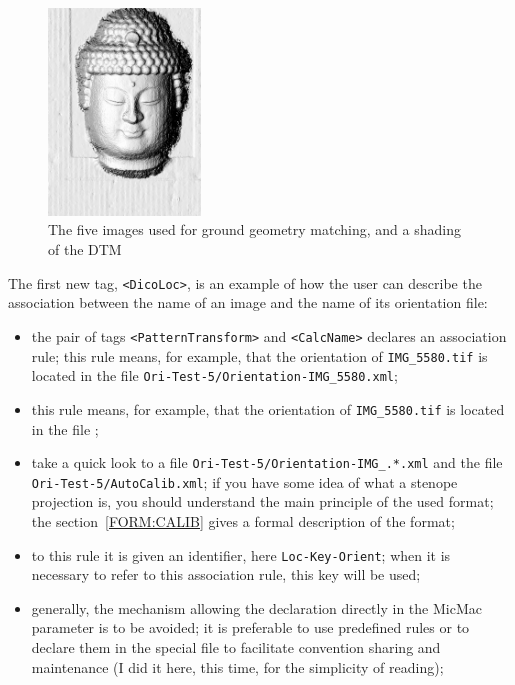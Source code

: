 \begin{figure}
\begin{center}
\includegraphics[height=55mm]{FIGS/Boudhas/Terrain-Shade.jpg}
\caption{The five images used for ground geometry matching, and a shading of the DTM}
\label{FIVEBOUDHA}
\end{center}
\end{figure}

The first new tag, {\tt <DicoLoc>}, is an example of how the user can
describe the association between the name of an image and the name
of its orientation file:

\begin{itemize}
   \item  the pair of tags {\tt  <PatternTransform>} and {\tt <CalcName>} declares an
          association rule; this rule means, for example, that the orientation of {\tt IMG\_5580.tif}
          is located in the file \newline
          {\tt Ori-Test-5/Orientation-IMG\_5580.xml};

    \item this rule means, for example,  that the orientation of  {\tt IMG\_5580.tif}
          is located in the file ;
    \item take a quick look to a file {\tt Ori-Test-5/Orientation-IMG\_.*.xml} and
         the file  {\tt Ori-Test-5/AutoCalib.xml}; if you have some idea of what
         a stenope projection is, you should understand the main principle of the used format;
         the section~\ref{FORM:CALIB} gives a formal description of the format;

    \item  to this rule it is given an identifier, here {\tt Loc-Key-Orient}; when it is necessary 
    		to refer to this association rule, this key will be used;

    \item  generally, the mechanism allowing the declaration directly in the MicMac
           parameter is to be avoided; it is preferable to use predefined rules or to declare
           them in the special file  to
           facilitate convention sharing and maintenance
           (I did it here, this time, for the simplicity of reading);
\end{itemize}

